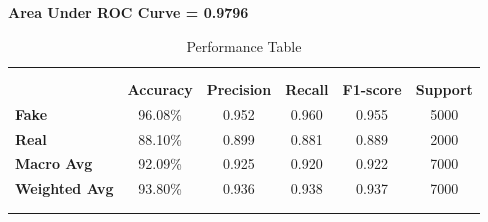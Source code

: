 \begin{enumerate}
			\textbf{Area Under ROC Curve = 0.9796}

\begin{table}[ht]
		\centering
		\begin{tabular}{lccccc}
		\multicolumn{6}{c}{\textbf{}} \\ 
		\multicolumn{6}{c}{\textbf{}} \\ 
		\textbf{} & \textbf{Accuracy} & \textbf{Precision} & \textbf{Recall} & \textbf{F1-score} & \textbf{Support} \\
		\textbf{Fake}  & 96.08\% & 0.952 & 0.960 & 0.955 & 5000 \\
		\textbf{Real} & 88.10\%  & 0.899 & 0.881 & 0.889 & 2000 \\
		\textbf{Macro Avg} & 92.09\% & 0.925 & 0.920 & 0.922 & 7000 \\
		\textbf{Weighted Avg} & 93.80\% & 0.936 & 0.938 & 0.937 &7000 \\ 
		\multicolumn{6}{c}{\textbf{}} \\
		\multicolumn{6}{c}{\textbf{}} \\
		\end{tabular}
		\caption{Performance Table}
		\end{table}
\end{enumerate}


\newpage
